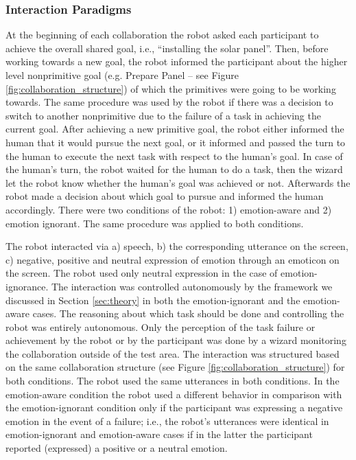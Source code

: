 \documentclass[12pt]{report}
\begin{document}
\subsubsection{Interaction Paradigms}
\label{sec-interaction-paradigms}
At the beginning of each collaboration the robot asked each participant to
achieve the overall shared goal, i.e., ``installing the solar panel''. Then,
before working towards a new goal, the robot informed the participant about the
higher level nonprimitive goal (e.g. Prepare Panel -- see Figure
\ref{fig:collaboration_structure}) of which the primitives were going to be
working towards. The same procedure was used by the robot if there was a
decision to switch to another nonprimitive due to the failure of a task in
achieving the current goal. After achieving a new primitive goal, the robot
either informed the human that it would pursue the next goal, or it informed and
passed the turn to the human to execute the next task with respect to the
human's goal. In case of the human's turn, the robot waited for the human to do
a task, then the wizard let the robot know whether the human's goal was achieved
or not. Afterwards the robot made a decision about which goal to pursue and
informed the human accordingly. There were two conditions of the robot: 1)
emotion-aware and 2) emotion ignorant. The same procedure was applied to both
conditions.

The robot interacted via a) speech, b) the corresponding utterance on the
screen, c) negative, positive and neutral expression of emotion through an
emoticon on the screen. The robot used only neutral expression in the case of
emotion-ignorance. The interaction was controlled autonomously by the framework
we discussed in Section \ref{sec:theory} in both the emotion-ignorant and the
emotion-aware cases. The reasoning about which task should be done and
controlling the robot was entirely autonomous. Only the perception of the task
failure or achievement by the robot or by the participant was done by a wizard
monitoring the collaboration outside of the test area. The interaction was
structured based on the same collaboration structure (see Figure
\ref{fig:collaboration_structure}) for both conditions. The robot used the same
utterances in both conditions. In the emotion-aware condition the robot used a
different behavior in comparison with the emotion-ignorant condition only if the
participant was expressing a negative emotion in the event of a failure; i.e.,
the robot's utterances were identical in emotion-ignorant and emotion-aware
cases if in the latter the participant reported (expressed) a positive or a
neutral emotion.
\end{document}
